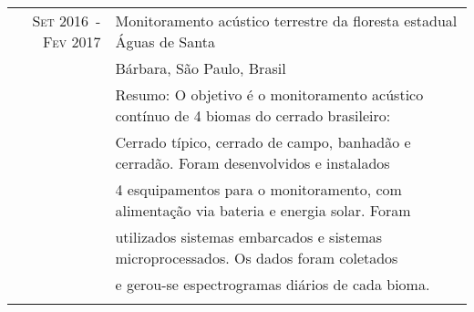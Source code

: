 \documentclass[a4paper,10pt]{article}
\begin{document}
\begin{tabular}{rl}

    \textsc{Set 2016~-~Fev 2017}    & Monitoramento acústico terrestre da floresta estadual Águas de Santa \\
                                    & Bárbara, São Paulo,  Brasil \\
                                    &\footnotesize{Resumo: O objetivo é o monitoramento acústico contínuo de 4 biomas do cerrado brasileiro:}\\ 
                                    &\footnotesize{Cerrado típico, cerrado de campo, banhadão e cerradão. Foram desenvolvidos e instalados}\\ 
                                    &\footnotesize{4 esquipamentos para o monitoramento, com alimentação via bateria e energia solar. Foram}\\
                                    &\footnotesize{utilizados sistemas embarcados e sistemas microprocessados. Os dados foram coletados}\\ 
                                    &\footnotesize{e gerou-se espectrogramas diários de cada bioma.}\\
                                    &\\
\end{tabular}

\end{document}
